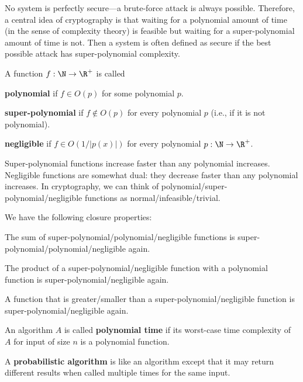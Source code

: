 No system is perfectly secure---a brute-force attack is always possible.
Therefore, a central idea of cryptography is that waiting for a polynomial amount of time (in the sense of complexity theory) is feasible but waiting for a super-polynomial amount of time is not.
Then a system is often defined as secure if the best possible attack has super-polynomial complexity.

\begin{definition}
 A function $f:\N\to\R^+$ is called
  \begin{compactitem}
   \item \textbf{polynomial} if $f\in O(p)$ for some polynomial $p$.
   \item \textbf{super-polynomial} if $f\nin O(p)$ for every polynomial $p$ (i.e., if it is not polynomial).
   \item \textbf{negligible} if $f\in O(1/|p(x)|)$ for every polynomial $p:\N\to\R^+$.
  \end{compactitem}
\end{definition}

Super-polynomial functions increase faster than any polynomial increases.
Negligible functions are somewhat dual: they decrease faster than any polynomial increases.
In cryptography, we can think of polynomial/super-polynomial/negligible functions as normal/infeasible/trivial.

\begin{theorem}
We have the following closure properties:
\begin{compactitem}
 \item The sum of super-polynomial/polynomial/negligible functions is super-polynomial/polynomial/negligible again.
 \item The product of a super-polynomial/negligible function with a polynomial function is super-polynomial/negligible again.
 \item A function that is greater/smaller than a super-polynomial/negligible function is super-polynomial/negligible again.
\end{compactitem}
\end{theorem}

\begin{definition}
 An algorithm $A$ is called \textbf{polynomial time} if its worst-case time complexity of $A$ for input of size $n$ is a polynomial function.
\end{definition}

\begin{definition}
 A \textbf{probabilistic algorithm} is like an algorithm except that it may return different results when called multiple times for the same input.
\end{definition}

